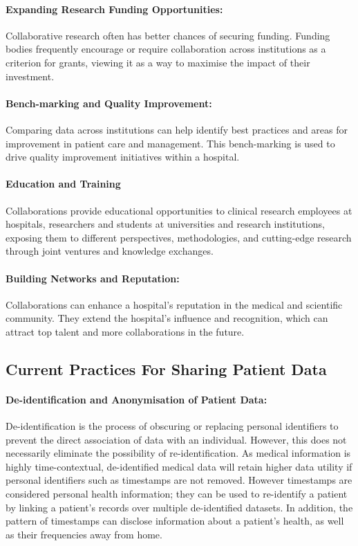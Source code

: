 \documentclass[11pt]{article}
\begin{document}
\paragraph{Expanding Research Funding Opportunities:} Collaborative research often has better chances of securing funding\cite{Vasan2021}. Funding bodies frequently encourage or require collaboration across institutions as a criterion for grants, viewing it as a way to maximise the impact of their investment.

\paragraph{Bench-marking and Quality Improvement:} Comparing data across institutions can help identify best practices and areas for improvement in patient care and management. This bench-marking is used to drive quality improvement initiatives within a hospital\cite{Werner2005}.

\paragraph{Education and Training} Collaborations provide educational opportunities to clinical research employees at hospitals, researchers and students at universities and research institutions, exposing them to different perspectives, methodologies, and cutting-edge research through joint ventures and knowledge exchanges.

\paragraph{Building Networks and Reputation:} Collaborations can enhance a hospital’s reputation in the medical and scientific community\cite{Vasan2021}. They extend the hospital’s influence and recognition, which can attract top talent and more collaborations in the future.

\subsection{Current Practices For Sharing Patient Data}

\paragraph{De-identification and Anonymisation of Patient Data:}
De-identification is the process of obscuring or replacing personal identifiers to prevent the direct association of data with an individual. However, this does not necessarily eliminate the possibility of re-identification. As medical information is highly time-contextual, de-identified medical data will retain higher data utility if personal identifiers such as timestamps are not removed. However timestamps are considered personal health information; they can be used to re-identify a patient by linking a patient's records over multiple de-identified datasets. In addition, the pattern of timestamps can disclose information about a patient's health, as well as their frequencies away from home.
\end{document}

